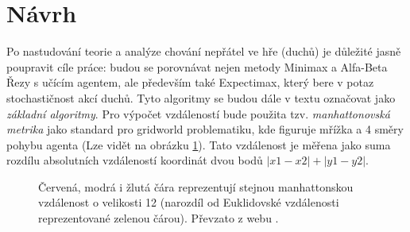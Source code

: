 \section{Návrh}
\label{navrh}
Po nastudování teorie a analýze chování nepřátel ve hře (duchů) je důležité jasně poupravit cíle práce: budou se porovnávat nejen metody Minimax a Alfa-Beta Řezy s učícím agentem, ale především také Expectimax, který bere v potaz stochastičnost akcí duchů. Tyto algoritmy se budou dále v textu označovat jako \textit{základní algoritmy}.
\newline
Pro výpočet vzdáleností bude použita tzv. \textit{manhattonovská metrika} \cite{manhattanDist} jako standard pro gridworld problematiku, kde figuruje mřížka a 4 směry pohybu agenta (Lze vidět na obrázku \ref{img:manhattanDist}). Tato vzdálenost je měřena jako suma rozdílu absolutních vzdáleností koordinát dvou bodů $\left|x1-x2\right|+\left|y1-y2\right|$.

\begin{figure}[!htbp]
\begin{center}
  	\caption[]{Červená, modrá i žlutá čára reprezentují stejnou manhattonskou vzdálenost o velikosti 12 (narozdíl od Euklidovské vzdálenosti reprezentované zelenou čárou). Převzato z webu \footnotemark{}.}
	\label{img:manhattanDist}
\end{center}
\end{figure}

